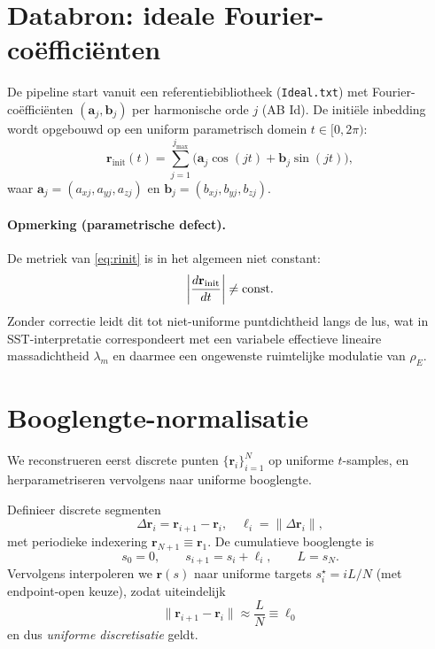 \documentclass[11pt]{article}
\newcommand{\rhoE}{\rho_{\!E}}\newcommand{\rhoe}{\rho_{\!E}}                           %
\begin{document}
        \section{Databron: ideale Fourier-co\"effici\"enten}
            De pipeline start vanuit een referentiebibliotheek (\texttt{Ideal.txt}) met Fourier-co\"effici\"enten $(\mathbf{a}_j,\mathbf{b}_j)$ per harmonische orde $j$ (AB Id). De initi\"ele inbedding wordt opgebouwd op een uniform parametrisch domein $t\in[0,2\pi)$:
            \begin{equation}
                \mathbf{r}_{\mathrm{init}}(t)=\sum_{j=1}^{j_{\max}} \Big(\mathbf{a}_{j}\cos(jt)+\mathbf{b}_{j}\sin(jt)\Big),
                \label{eq:rinit}
            \end{equation}
            waar $\mathbf{a}_j=(a_{xj},a_{yj},a_{zj})$ en $\mathbf{b}_j=(b_{xj},b_{yj},b_{zj})$.

            \paragraph{Opmerking (parametrische defect).}
                De metriek van \eqref{eq:rinit} is in het algemeen niet constant:
                \[
                    \abs{\frac{d\mathbf{r}_{\mathrm{init}}}{dt}} \neq \text{const}.
                \]
                Zonder correctie leidt dit tot niet-uniforme puntdichtheid langs de lus, wat in SST-interpretatie correspondeert met een variabele effectieve lineaire massadichtheid $\lambda_m$ en daarmee een ongewenste ruimtelijke modulatie van $\rhoE$.

        \section{Booglengte-normalisatie}
        We reconstrueren eerst discrete punten $\{\mathbf{r}_i\}_{i=1}^{N}$ op uniforme $t$-samples, en herparametriseren vervolgens naar uniforme booglengte.

        Definieer discrete segmenten
        \[
            \Delta \mathbf{r}_i = \mathbf{r}_{i+1}-\mathbf{r}_i,\quad
            \ell_i = \|\Delta \mathbf{r}_i\|,
        \]
        met periodieke indexering $\mathbf{r}_{N+1}\equiv \mathbf{r}_1$.
        De cumulatieve booglengte is
        \[
            s_0=0,\qquad s_{i+1}=s_i+\ell_i,\qquad L=s_N.
        \]
        Vervolgens interpoleren we $\mathbf{r}(s)$ naar uniforme targets $s_i^\star = iL/N$ (met endpoint-open keuze), zodat uiteindelijk
        \[
            \|\mathbf{r}_{i+1}-\mathbf{r}_i\|\approx \frac{L}{N}\equiv \ell_0
        \]
        en dus \emph{uniforme discretisatie} geldt.
\end{document}

